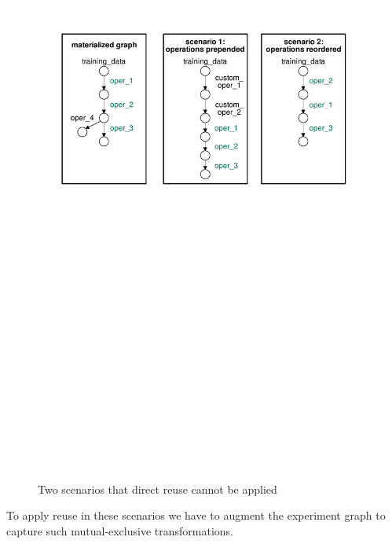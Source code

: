\begin{figure}
\centering
\includegraphics[width=\columnwidth]{../images/unaligned-operations}
\caption{Two scenarios that direct reuse cannot be applied}
\label{fig-unaligned-operations}
\end{figure}

To apply reuse in these scenarios we have to augment the experiment graph to capture such mutual-exclusive transformations.

